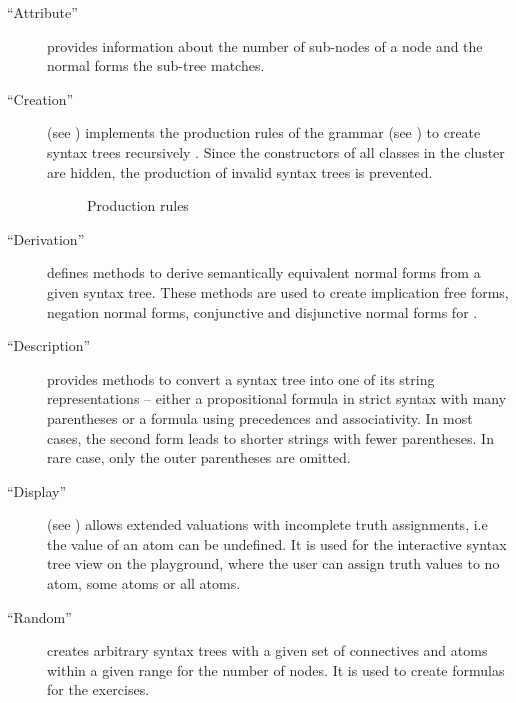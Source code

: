 \begin{description}

\item[“Attribute”] provides information about the number of sub-nodes of a node 
and the normal forms the sub-tree matches. 

\item[“Creation”] (see ) 
implements the production rules of the grammar (see )
to create syntax trees recursively .
Since the constructors of all classes in the cluster are hidden, 
the production of invalid syntax trees is prevented.

\begin{figure}[htbp]
\begin{center}
\caption{Production rules}
\label{fig:NyayaNodeCreation}
\end{center}
\end{figure}

\item[“Derivation”] defines methods to derive semantically equivalent normal forms from a given syntax tree.
These methods are used to create implication free forms, negation normal forms, conjunctive and disjunctive normal forms for \BoolTool.

\item[“Description”] provides methods to convert a syntax tree into one of its string representations – 
either a propositional formula in strict syntax with many parentheses 
or a formula using precedences and associativity.
In most cases, the second form leads to shorter strings with fewer parentheses. 
In rare case, only the outer parentheses are omitted.

\item[“Display”]\label{item:DISPLAY} (see ) allows extended valuations
with incomplete truth assignments, i.e the value of an atom can be undefined.
It is used for the interactive syntax tree view on the playground, 
where the user can assign truth values to no atom, some atoms or all atoms.
% 


\item[“Random”] creates arbitrary syntax trees with a given set of connectives and atoms 
within a given range for the number of nodes. It is used to create formulas for the exercises.


\end{description}
